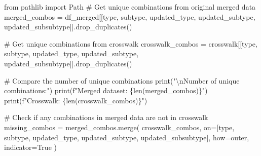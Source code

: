 \documentclass[
  letterpaper,
  DIV=11,
  numbers=noendperiod]{scrartcl}
\newenvironment{Shaded}{\begin{snugshade}}{\end{snugshade}}
\newcommand{\BuiltInTok}[1]{\textcolor[rgb]{0.00,0.23,0.31}{#1}}
\newcommand{\CharTok}[1]{\textcolor[rgb]{0.13,0.47,0.30}{#1}}
\newcommand{\CommentTok}[1]{\textcolor[rgb]{0.37,0.37,0.37}{#1}}
\newcommand{\ImportTok}[1]{\textcolor[rgb]{0.00,0.46,0.62}{#1}}
\newcommand{\NormalTok}[1]{\textcolor[rgb]{0.00,0.23,0.31}{#1}}
\newcommand{\OperatorTok}[1]{\textcolor[rgb]{0.37,0.37,0.37}{#1}}
\newcommand{\SpecialCharTok}[1]{\textcolor[rgb]{0.37,0.37,0.37}{#1}}
\newcommand{\SpecialStringTok}[1]{\textcolor[rgb]{0.13,0.47,0.30}{#1}}
\newcommand{\StringTok}[1]{\textcolor[rgb]{0.13,0.47,0.30}{#1}}
\newcommand{\VariableTok}[1]{\textcolor[rgb]{0.07,0.07,0.07}{#1}}
\begin{document}
\begin{Shaded}
\begin{Highlighting}[]
\ImportTok{from}\NormalTok{ pathlib }\ImportTok{import}\NormalTok{ Path}
\CommentTok{\# Get unique combinations from original merged data}
\NormalTok{merged\_combos }\OperatorTok{=}\NormalTok{ df\_merged[[}\StringTok{\textquotesingle{}type\textquotesingle{}}\NormalTok{, }\StringTok{\textquotesingle{}subtype\textquotesingle{}}\NormalTok{, }
                          \StringTok{\textquotesingle{}updated\_type\textquotesingle{}}\NormalTok{, }\StringTok{\textquotesingle{}updated\_subtype\textquotesingle{}}\NormalTok{, }
                          \StringTok{\textquotesingle{}updated\_subsubtype\textquotesingle{}}\NormalTok{]].drop\_duplicates()}

\CommentTok{\# Get unique combinations from crosswalk}
\NormalTok{crosswalk\_combos }\OperatorTok{=}\NormalTok{ crosswalk[[}\StringTok{\textquotesingle{}type\textquotesingle{}}\NormalTok{, }\StringTok{\textquotesingle{}subtype\textquotesingle{}}\NormalTok{, }
                             \StringTok{\textquotesingle{}updated\_type\textquotesingle{}}\NormalTok{, }\StringTok{\textquotesingle{}updated\_subtype\textquotesingle{}}\NormalTok{, }
                             \StringTok{\textquotesingle{}updated\_subsubtype\textquotesingle{}}\NormalTok{]].drop\_duplicates()}

\CommentTok{\# Compare the number of unique combinations}
\BuiltInTok{print}\NormalTok{(}\StringTok{"}\CharTok{\textbackslash{}n}\StringTok{Number of unique combinations:"}\NormalTok{)}
\BuiltInTok{print}\NormalTok{(}\SpecialStringTok{f"Merged dataset: }\SpecialCharTok{\{}\BuiltInTok{len}\NormalTok{(merged\_combos)}\SpecialCharTok{\}}\SpecialStringTok{"}\NormalTok{)}
\BuiltInTok{print}\NormalTok{(}\SpecialStringTok{f"Crosswalk: }\SpecialCharTok{\{}\BuiltInTok{len}\NormalTok{(crosswalk\_combos)}\SpecialCharTok{\}}\SpecialStringTok{"}\NormalTok{)}

\CommentTok{\# Check if any combinations in merged data are not in crosswalk}
\NormalTok{missing\_combos }\OperatorTok{=}\NormalTok{ merged\_combos.merge(}
\NormalTok{    crosswalk\_combos, }
\NormalTok{    on}\OperatorTok{=}\NormalTok{[}\StringTok{\textquotesingle{}type\textquotesingle{}}\NormalTok{, }\StringTok{\textquotesingle{}subtype\textquotesingle{}}\NormalTok{, }\StringTok{\textquotesingle{}updated\_type\textquotesingle{}}\NormalTok{, }\StringTok{\textquotesingle{}updated\_subtype\textquotesingle{}}\NormalTok{, }\StringTok{\textquotesingle{}updated\_subsubtype\textquotesingle{}}\NormalTok{],}
\NormalTok{    how}\OperatorTok{=}\StringTok{\textquotesingle{}outer\textquotesingle{}}\NormalTok{,}
\NormalTok{    indicator}\OperatorTok{=}\VariableTok{True}
\NormalTok{)}


\end{Highlighting}
\end{Shaded}
\end{document}
